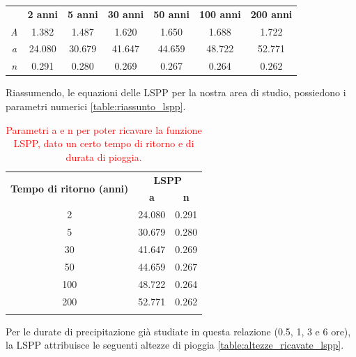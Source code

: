 \begin{table}[H] \centering
    \begin{tabular}{ccccccc}
    \toprule
 & \textbf{2 anni} & \textbf{5 anni} & \textbf{30 anni} & \textbf{50 anni} & \textbf{100 anni} & \textbf{200 anni} \\
    \textit{A} & 1.382  & 1.487  & 1.620  & 1.650  & 1.688  & 1.722  \\
    \textit{a} & 24.080 & 30.679 & 41.647 & 44.659 & 48.722 & 52.771 \\
    \textit{n} & 0.291  & 0.280  & 0.269  & 0.267  & 0.264  & 0.262  \\
    \bottomrule
    \end{tabular}
    \label{table:valori_riassuntivi_lspp}
    \end{table}
Riassumendo, le equazioni delle LSPP per la nostra area di studio, possiedono i parametri numerici \eqref{table:riassunto_lspp}.

\begin{table}[H] \centering
    \caption{\textcolor{red}{Parametri a e n per poter ricavare la funzione LSPP, dato un certo tempo di ritorno e di durata di pioggia.}}
    \begin{tabular}{ccc}
    \toprule
    \multirow{2}{*}{\textbf{Tempo di ritorno (anni)}} & \multicolumn{2}{c}{\textbf{LSPP}} \\
     & \textbf{a}      & \textbf{n}      \\
    2                                                 & 24.080          & 0.291           \\
    5                                                 & 30.679          & 0.280           \\
    30                                                & 41.647          & 0.269           \\
    50                                                & 44.659          & 0.267           \\
    100                                               & 48.722          & 0.264           \\
    200                                               & 52.771          & 0.262   \\
    \bottomrule  
    \label{parametri_LSPP}     
    \end{tabular}
    \label{table:riassunto_lspp}
    \end{table}

Per le durate di precipitazione già studiate in questa relazione (0.5, 1, 3 e 6 ore), la LSPP attribuisce le seguenti altezze di pioggia \eqref{table:altezze_ricavate_lspp}.

